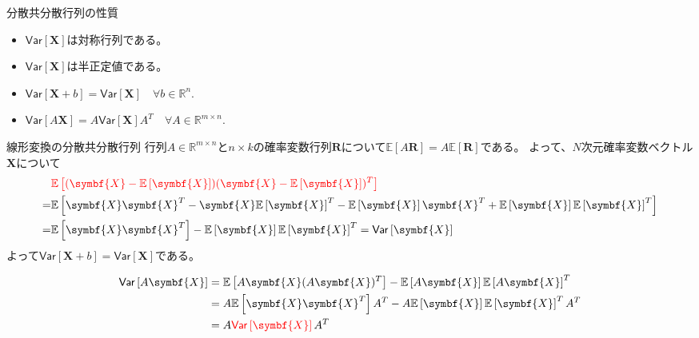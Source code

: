 \documentclass[lualatex,handout]{beamer}
\newcommand{\mycolor}[2]{%
  \begingroup
  \colorlet{currentcolor}{.}%
  \color{#1}#2%
  \color{currentcolor}%
  \endgroup
}
\newcommand{\emm}[1]{\mycolor{red}{#1}}
\newcommand{\expt}[1]{\mathbb{E}\left[#1\right]}
\newcommand{\vc}[1]{\mathsf{Var}\left[#1\right]}
\theoremstyle{definition}
\begin{document}
\begin{frame}{分散共分散行列の性質}
\begin{itemize}
\setlength{\itemsep}{2em}
\item $\vc{\symbf{X}}$は対称行列である。
\item $\vc{\symbf{X}}$は半正定値である。
\item $\vc{\symbf{X}+b}=\vc{\symbf{X}}\quad\forall b\in\mathbb{R}^n$.
\item $\vc{A\symbf{X}}=A\vc{\symbf{X}}A^T\quad\forall A\in\mathbb{R}^{m\times n}$.
\end{itemize}
\end{frame}

\begin{frame}{線形変換の分散共分散行列}
行列$A\in\mathbb{R}^{m\times n}$と$n\times k$の確率変数行列$\symbf{R}$について$\expt{A\symbf{R}}=A\expt{\symbf{R}}$である。
よって、$N$次元確率変数ベクトル$\symbf{X}$について
\begin{align*}
&\emm{\expt{(\symbf{X} - \expt{\symbf{X}})(\symbf{X} - \expt{\symbf{X}})^T}}\\
=&\expt{\symbf{X}\symbf{X}^T - \symbf{X}\expt{\symbf{X}}^T - \expt{\symbf{X}}\symbf{X}^T + \expt{\symbf{X}}\expt{\symbf{X}}^T}\\
=& \expt{\symbf{X} \symbf{X}^T} - \expt{\symbf{X}}\expt{\symbf{X}}^T
=\vc{\symbf{X}}
\end{align*}
よって$\vc{\symbf{X}+b}=\vc{\symbf{X}}$である。

\vspace{1em}
\begin{align*}
\vc{A\symbf{X}}&=\expt{A\symbf{X} (A\symbf{X})^T} - \expt{A\symbf{X}}\expt{A\symbf{X}}^T\\
&=A\expt{\symbf{X} \symbf{X}^T}A^T - A\expt{\symbf{X}}\expt{\symbf{X}}^TA^T\\
&=A\emm{\vc{\symbf{X}}}A^T
\end{align*}
\end{frame}
\end{document}
